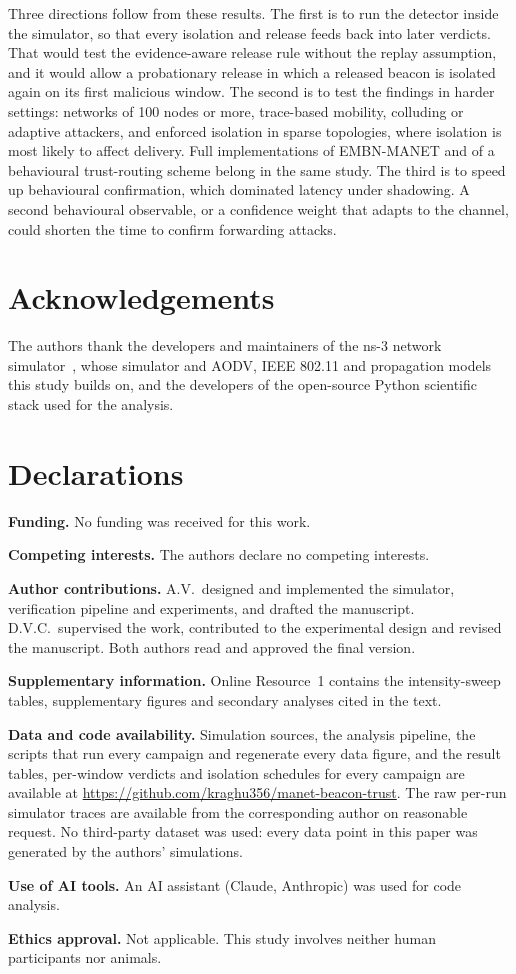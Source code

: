 Three directions follow from these results. The first is to run the detector
inside the simulator, so that every isolation and release feeds back into
later verdicts. That would test the evidence-aware release rule without the
replay assumption, and it would allow a probationary release in which a
released beacon is isolated again on its first malicious window. The second
is to test the findings in harder settings: networks of 100 nodes or more,
trace-based mobility, colluding or adaptive attackers, and enforced
isolation in sparse topologies, where isolation is most likely to affect
delivery. Full implementations of EMBN-MANET and of a behavioural
trust-routing scheme belong in the same study. The third is to speed up
behavioural confirmation, which dominated latency under shadowing. A second
behavioural observable, or a confidence weight that adapts to the channel,
could shorten the time to confirm forwarding attacks.

\section*{Acknowledgements}

The authors thank the developers and maintainers of the ns-3 network
simulator~\cite{ns3}, whose simulator and AODV, IEEE 802.11 and propagation
models this study builds on, and the developers of the open-source Python
scientific stack used for the analysis.

\section*{Declarations}

\textbf{Funding.} No funding was received for this work.

\textbf{Competing interests.} The authors declare no competing interests.

\textbf{Author contributions.} A.V.\ designed and implemented the simulator,
verification pipeline and experiments, and drafted the manuscript. D.V.C.\
supervised the work, contributed to the experimental design and revised the
manuscript. Both authors read and approved the final version.

\textbf{Supplementary information.} Online Resource~1 contains the
intensity-sweep tables, supplementary figures and secondary analyses cited in
the text.

\textbf{Data and code availability.} Simulation sources, the analysis
pipeline, the scripts that run every campaign and regenerate every data
figure, and the result tables, per-window verdicts and isolation schedules
for every campaign are available at
\url{https://github.com/kraghu356/manet-beacon-trust}. The raw per-run
simulator traces are available from the corresponding author
on reasonable request. No third-party dataset was used: every data point in
this paper was generated by the authors' simulations.

\textbf{Use of AI tools.} An AI assistant (Claude, Anthropic) was used for
code analysis.

\textbf{Ethics approval.} Not applicable. This study involves neither human
participants nor animals.
